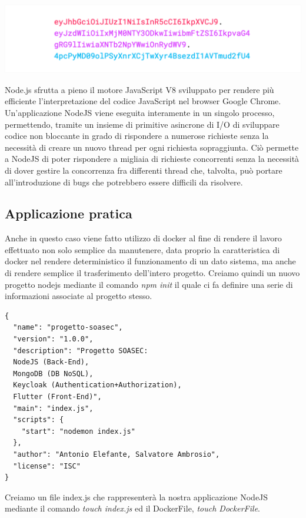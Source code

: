 \documentclass[twoside]{report}
\begin{document}
\begin{center}
\begin{minipage}{0.75\linewidth}
    \vspace{2mm}
    \centering
    \includegraphics[width= \linewidth]{1.png}
    \vspace{2mm}
\end{minipage}
\end{center}

Node.js sfrutta a pieno il motore JavaScript V8 sviluppato per rendere più efficiente l'interpretazione del codice JavaScript nel browser Google Chrome.
\bigbreak
Un'applicazione NodeJS viene eseguita interamente in un singolo processo, permettendo, tramite un insieme di primitive asincrone di I/O di sviluppare codice non bloccante in grado di rispondere a numerose richieste senza la necessità di creare un nuovo thread per ogni richiesta sopraggiunta.
\bigbreak
Ciò permette a NodeJS di poter rispondere a migliaia di richieste concorrenti senza la necessità di dover gestire la concorrenza fra differenti thread che, talvolta, può portare all'introduzione di bugs che potrebbero essere difficili da risolvere.

\subsection{Applicazione pratica}

Anche in questo caso viene fatto utilizzo di docker al fine di rendere il lavoro effettuato non solo semplice da manutenere, data proprio la caratteristica di docker nel rendere deterministico il funzionamento di un dato sistema, ma anche di rendere semplice il trasferimento dell'intero progetto.
\bigbreak
Creiamo quindi un nuovo progetto nodejs mediante il comando \textit{npm init} il quale ci fa definire una serie di informazioni associate al progetto stesso.


\begin{listing}[h!]
\begin{verbatim}
{
  "name": "progetto-soasec",
  "version": "1.0.0",
  "description": "Progetto SOASEC: 
  NodeJS (Back-End), 
  MongoDB (DB NoSQL), 
  Keycloak (Authentication+Authorization), 
  Flutter (Front-End)",
  "main": "index.js",
  "scripts": {
    "start": "nodemon index.js"
  },
  "author": "Antonio Elefante, Salvatore Ambrosio",
  "license": "ISC"
}
\end{verbatim}
\end{listing}
\FloatBarrier
Creiamo un file index.js che rappresenterà la nostra applicazione NodeJS mediante il comando \textit{touch index.js} ed il DockerFile, \textit{touch DockerFile}. 
\end{document}
